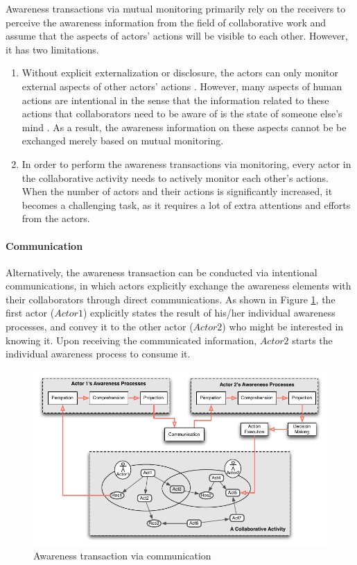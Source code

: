 Awareness transactions via mutual monitoring primarily rely on the receivers to perceive the awareness information from the field of collaborative work and assume that the aspects of actors' actions will be visible to each other. However, it has two limitations. 
\begin{enumerate}
	\item Without explicit externalization or disclosure, the actors can only monitor external aspects of other actors' actions \cite{Rittenbruch2007}. However, many aspects of human actions are intentional in the sense that the information related to these actions that collaborators need to be aware of is the state of someone else's mind \cite{carroll2003a}. As a result, the awareness information on these aspects cannot be be exchanged merely based on mutual monitoring.
	\item In order to perform the awareness transactions via monitoring, every actor in the collaborative activity needs to actively monitor each other's actions. When the number of actors and their actions is significantly increased, it becomes a challenging task, as it requires a lot of extra attentions and efforts from the actors.
\end{enumerate}

\paragraph*{Communication} %
\label{par:communication}
Alternatively, the awareness transaction can be conducted via intentional communications, in which actors explicitly exchange the awareness elements with their collaborators through direct communications. As shown in Figure \ref{fig:trans_communication}, the first actor ($Actor1$) explicitly states the result of his/her individual awareness processes, and convey it to the other actor ($Actor2$) who might be interested in knowing it. Upon receiving the communicated information, $Actor2$ starts the individual awareness process to consume it. 

\begin{figure}[htbp] %
   \centering
   \includegraphics{trans_communication.pdf} 
   \caption{Awareness transaction via communication}
   \label{fig:trans_communication}
\end{figure}

